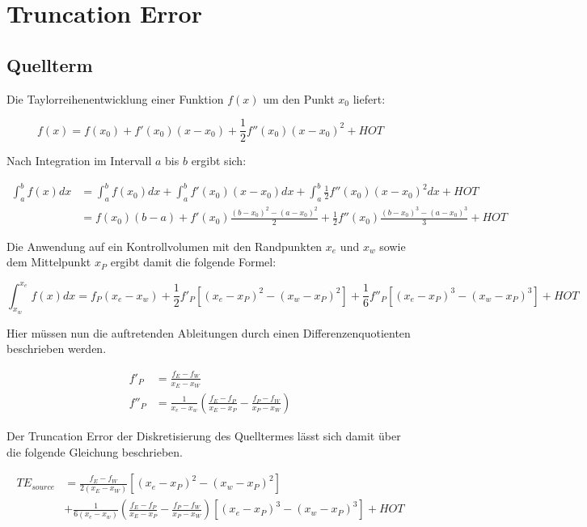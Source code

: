\documentclass[10pt, ngerman,colorback,accentcolor=tud2d]{tudreport}
\begin{document}
\chapter{Truncation Error}
\label{cha:Truncation_Error}

\section{Quellterm}
\label{sec:Quellterm}


Die Taylorreihenentwicklung einer Funktion $f(x)$ um den Punkt $x_0$
liefert:

\begin{equation*}
  f(x) = f(x_0) + f'(x_0)(x-x_0) + \frac{1}{2} f''(x_0)(x-x_0)^2 + HOT
\end{equation*}

Nach Integration im Intervall $a$ bis $b$ ergibt sich:

\begin{align*}
  \int_a^b f(x) dx &= \int_a^b f(x_0) dx + \int_a^b f'(x_0)(x-x_0) dx
+ \int_a^b \frac{1}{2} f''(x_0)(x-x_0)^2 dx + HOT\\
&= f(x_0) (b-a) + f'(x_0) \frac{(b-x_0)^2-(a-x_0)^2}{2}
+ \frac{1}{2} f''(x_0) \frac{(b-x_0)^3-(a-x_0)^3}{3} +HOT
\end{align*}

Die Anwendung auf ein Kontrollvolumen mit den Randpunkten $x_e$ und
$x_w$ sowie dem Mittelpunkt $x_P$ ergibt damit die folgende Formel:

\begin{equation*}
  \int_{x_w}^{x_e} f(x)dx = f_P(x_e-x_w)
+ \frac{1}{2} f'_P \left[{(x_e-x_P)^2-(x_w-x_P)^2}\right]
+ \frac{1}{6} f''_P \left[{{(x_e-x_P)}^3-{(x_w-x_P)}^3}\right] + HOT
\end{equation*}

Hier müssen nun die auftretenden Ableitungen durch einen Differenzenquotienten
beschrieben werden.

\begin{align*}
  f'_P &=\frac{f_E-f_W}{x_E-x_W} \\
  f''_P &= \frac{1}{x_e-x_w}\left(\frac{f_E-f_P}{x_E-x_P}-\frac{f_P-f_W}{x_P-x_W}\right)
\end{align*}

Der Truncation Error der Diskretisierung des Quelltermes lässt sich damit über die
folgende Gleichung beschrieben.

\begin{align}
  TE_{source} &=
 \frac{f_E-f_W}{2(x_E-x_W)}  \left[{(x_e-x_P)^2-(x_w-x_P)^2}\right]\nonumber\\
&+\frac{1}{6(x_e-x_w)}\left(\frac{f_E-f_P}{x_E-x_P}-\frac{f_P-f_W}{x_P-x_W}\right)
  \left[{{(x_e-x_P)}^3-{(x_w-x_P)}^3}\right] + HOT
\end{align}
\end{document}
